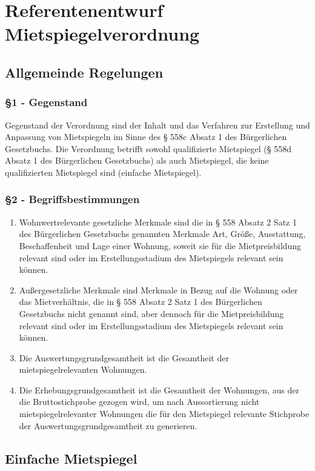 \chapter{Referentenentwurf Mietspiegelverordnung}
\minitoc
    \section{Allgemeinde Regelungen}
        \subsection{\S 1 - Gegenstand}
        Gegenstand der Verordnung sind der Inhalt und das Verfahren zur Erstellung und Anpassung von Mietspiegeln im Sinne des § 558c Absatz 1 des Bürgerlichen Gesetzbuchs. Die Verordnung betrifft sowohl qualifizierte Mietspiegel (§ 558d Absatz 1 des Bürgerlichen Gesetzbuchs) als auch Mietspiegel, die keine qualifizierten Mietspiegel sind (einfache Mietspiegel).
        \subsection{\S2 - Begriffsbestimmungen}
        \begin{enumerate}[label=(\arabic*)]
            \item Wohnwertrelevante gesetzliche Merkmale sind die in § 558 Absatz 2 Satz 1 des Bürgerlichen Gesetzbuchs genannten Merkmale Art, Größe, Ausstattung, Beschaffenheit und Lage einer Wohnung, soweit sie für die Mietpreisbildung relevant sind oder im Erstellungsstadium des Mietspiegels relevant sein können.
            \item Außergesetzliche Merkmale sind Merkmale in Bezug auf die Wohnung oder das Mietverhältnis, die in § 558 Absatz 2 Satz 1 des Bürgerlichen Gesetzbuchs nicht genannt sind, aber dennoch für die Mietpreisbildung relevant sind oder im Erstellungsstadium des Mietspiegels relevant sein können.
            \item Die Auswertungsgrundgesamtheit ist die Gesamtheit der mietspiegelrelevanten Wohnungen.
            \item Die Erhebungsgrundgesamtheit ist die Gesamtheit der Wohnungen, aus der die Bruttostichprobe gezogen wird, um nach Aussortierung nicht mietspiegelrelevanter Wohnungen die für den Mietspiegel relevante Stichprobe der Auswertungsgrundgesamtheit zu generieren.
        \end{enumerate}

\section{Einfache Mietspiegel}
